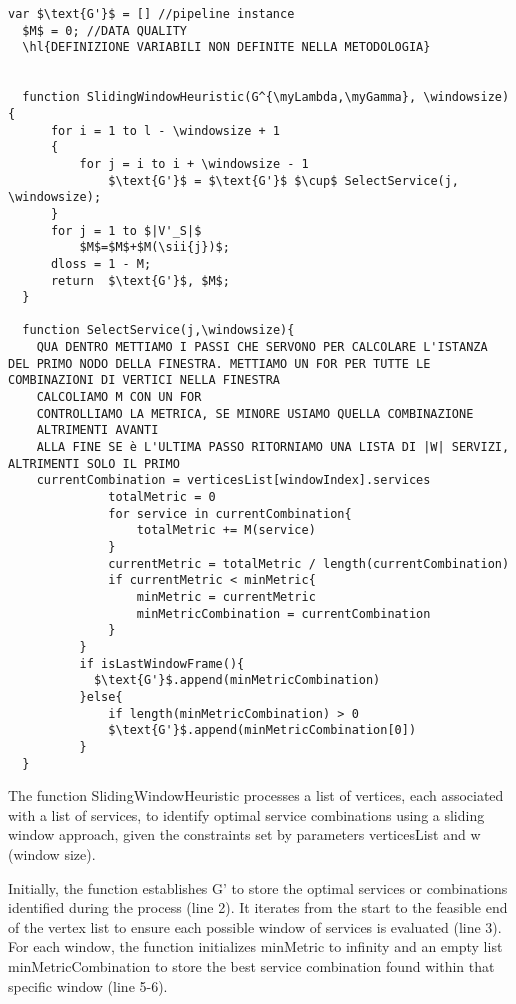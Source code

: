 \begin{lstlisting}[frame=single,mathescape, caption={Sliding Window Heuristic with Selection of First Service from Optimal Combination},label={lst:slidingwindowfirstservice}]
  var $\text{G'}$ = [] //pipeline instance
  $M$ = 0; //DATA QUALITY
  \hl{DEFINIZIONE VARIABILI NON DEFINITE NELLA METODOLOGIA}
  
  
  function SlidingWindowHeuristic(G^{\myLambda,\myGamma}, \windowsize){
      for i = 1 to l - \windowsize + 1
      {
          for j = i to i + \windowsize - 1
              $\text{G'}$ = $\text{G'}$ $\cup$ SelectService(j, \windowsize);
      }
      for j = 1 to $|V'_S|$
          $M$=$M$+$M(\sii{j})$;
      dloss = 1 - M;
      return  $\text{G'}$, $M$;
  }

  function SelectService(j,\windowsize){
    QUA DENTRO METTIAMO I PASSI CHE SERVONO PER CALCOLARE L'ISTANZA DEL PRIMO NODO DELLA FINESTRA. METTIAMO UN FOR PER TUTTE LE COMBINAZIONI DI VERTICI NELLA FINESTRA
    CALCOLIAMO M CON UN FOR
    CONTROLLIAMO LA METRICA, SE MINORE USIAMO QUELLA COMBINAZIONE
    ALTRIMENTI AVANTI
    ALLA FINE SE è L'ULTIMA PASSO RITORNIAMO UNA LISTA DI |W| SERVIZI, ALTRIMENTI SOLO IL PRIMO
    currentCombination = verticesList[windowIndex].services
              totalMetric = 0
              for service in currentCombination{
                  totalMetric += M(service)
              }
              currentMetric = totalMetric / length(currentCombination)
              if currentMetric < minMetric{
                  minMetric = currentMetric
                  minMetricCombination = currentCombination
              }
          }
          if isLastWindowFrame(){
            $\text{G'}$.append(minMetricCombination)
          }else{
              if length(minMetricCombination) > 0
              $\text{G'}$.append(minMetricCombination[0])
          }
  }

  \end{lstlisting}

  The function SlidingWindowHeuristic processes a list of vertices, each associated with a list of services, to identify optimal service combinations using a sliding window approach, given the constraints set by parameters verticesList and w (window size).

  Initially, the function establishes $\text{G'}$ to store the optimal services or combinations identified during the process (line 2). It iterates from the start to the feasible end of the vertex list to ensure each possible window of services is evaluated (line 3). For each window, the function initializes minMetric to infinity and an empty list minMetricCombination to store the best service combination found within that specific window (line 5-6).


